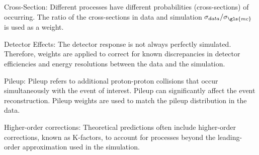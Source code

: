 Cross-Section: Different processes have different probabilities (cross-sections) of occurring. The ratio of the
cross-sections in data and simulation $\sigma_{data}/\sigma_{\gls{mc}}$ is used as a weight.

Detector Effects: The detector response is not always perfectly simulated. Therefore, weights are applied to correct for
known discrepancies in detector efficiencies and energy resolutions between the data and the simulation.

Pileup: Pileup refers to additional proton-proton collisions that occur simultaneously with the event of interest.
Pileup can significantly affect the event reconstruction. Pileup weights are used to match the pileup distribution in
the data.

Higher-order corrections: Theoretical predictions often include higher-order corrections, known as K-factors, to account
for processes beyond the leading-order approximation used in the simulation.